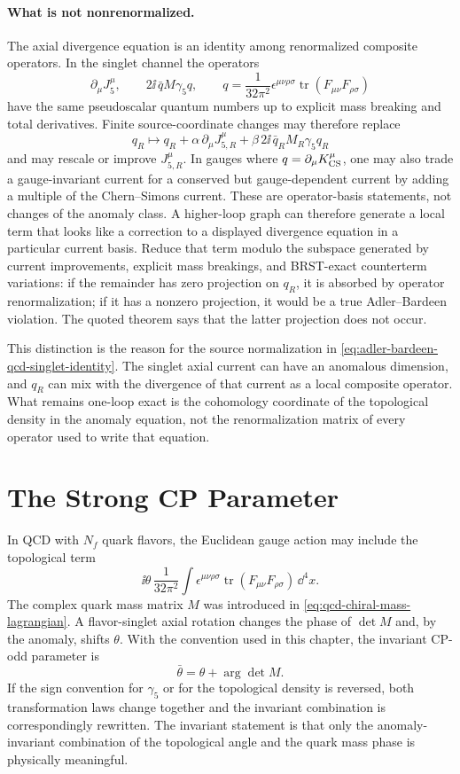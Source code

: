 \paragraph{What is not nonrenormalized.}
The axial divergence equation is an identity among renormalized composite
operators.  In the singlet channel the operators
\[
  \partial_\mu J_{5}^{\mu},\qquad
  2\ii\,\bar q M\gamma_5q,\qquad
  q=\frac1{32\pi^2}\epsilon^{\mu\nu\rho\sigma}
  \operatorname{tr}(F_{\mu\nu}F_{\rho\sigma})
\]
have the same pseudoscalar quantum numbers up to explicit mass breaking and
total derivatives.  Finite source-coordinate changes may therefore replace
\[
  q_R\longmapsto q_R+\alpha\,\partial_\mu J_{5,R}^{\mu}
  +\beta\,2\ii\,\bar q_R M_R\gamma_5q_R
\]
and may rescale or improve \(J_{5,R}^\mu\).  In gauges where
\(q=\partial_\mu K^\mu_{\rm CS}\), one may also trade a gauge-invariant
current for a conserved but gauge-dependent current by adding a multiple of
the Chern--Simons current.  These are operator-basis statements, not changes
of the anomaly class.  A higher-loop graph can therefore generate a local term
that looks like a correction to a displayed divergence equation in a
particular current basis.  Reduce that term modulo the subspace generated by
current improvements, explicit mass breakings, and BRST-exact counterterm
variations: if the remainder has zero projection on \(q_R\), it is absorbed
by operator renormalization; if it has a nonzero projection, it would be a
true Adler--Bardeen violation.  The quoted theorem says that the latter
projection does not occur.

This distinction is the reason for the source normalization in
\eqref{eq:adler-bardeen-qcd-singlet-identity}.  The singlet axial current can
have an anomalous dimension, and \(q_R\) can mix with the divergence of that
current as a local composite operator.  What remains one-loop exact is the
cohomology coordinate of the topological density in the anomaly equation, not
the renormalization matrix of every operator used to write that equation.

\section{The Strong CP Parameter}

In QCD with \(N_f\) quark flavors, the Euclidean gauge action may include the
topological term
\[
  \ii\theta\,
  \frac1{32\pi^2}
  \int
  \epsilon^{\mu\nu\rho\sigma}
  \operatorname{tr}(F_{\mu\nu}F_{\rho\sigma})\,\dd^4x .
\]
The complex quark mass matrix \(M\) was introduced in
\eqref{eq:qcd-chiral-mass-lagrangian}.  A flavor-singlet axial rotation
changes the phase of \(\det M\) and, by the anomaly, shifts \(\theta\).  With
the convention used in this chapter, the invariant CP-odd parameter is
\begin{equation}
  \bar\theta
  =
  \theta+\arg\det M .
  \label{eq:qcd-physical-theta}
\end{equation}
If the sign convention for \(\gamma_5\) or for the topological density is
reversed, both transformation laws change together and the invariant
combination is correspondingly rewritten.  The invariant statement is that
only the anomaly-invariant combination of the topological angle and the quark
mass phase is physically meaningful.

